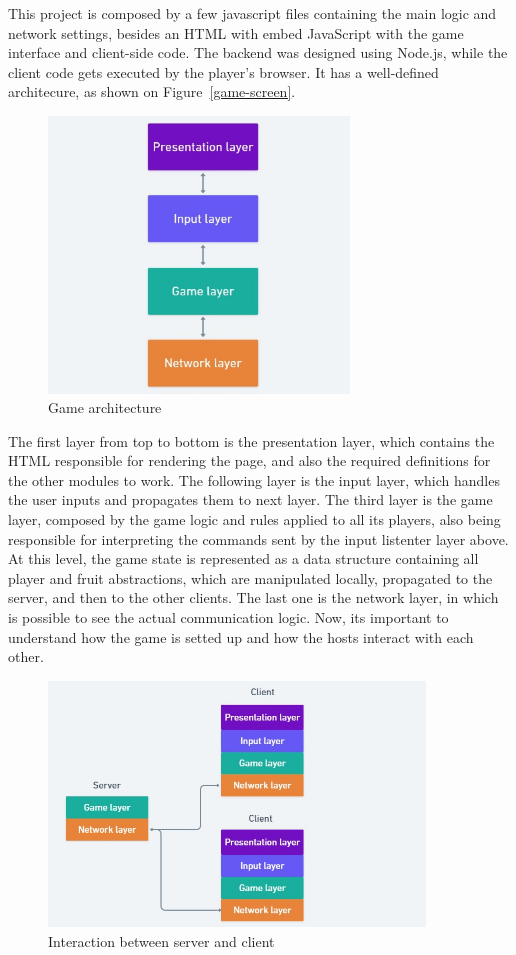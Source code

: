 \documentclass[english]{sbrt}
\begin{document}
This project is composed by a few javascript files containing the main logic and network settings, besides an HTML with embed JavaScript with the game interface and client-side code. The backend was designed using Node.js, while the client code gets executed by the player's browser. It has a well-defined architecure, as shown on Figure~\ref{game-screen}.

\begin{figure}[H]
  \centering
  \includegraphics[width=8cm]{game-layers.jpg}
  \caption{Game architecture}
  \label{game-layers}
\end{figure}

The first layer from top to bottom is the presentation layer, which contains the HTML responsible for rendering the page, and also the required definitions for the other modules to work.
The following layer is the input layer, which handles the user inputs and propagates them to next layer. The third layer is the game layer, composed by the game logic and rules
applied to all its players, also being responsible for interpreting the commands sent by the input listenter layer above. At this level, the game state is represented as a data structure containing
all player and fruit abstractions, which are manipulated locally, propagated to the server, and then to the other clients. The last one is the network layer, in which is possible to see the actual communication logic.
Now, its important to understand how the game is setted up and how the hosts interact with each other.

\begin{figure}[H]
  \centering
  \includegraphics[width=10cm]{game-diagram.jpg}
  \caption{Interaction between server and client}
  \label{game-diagram}
\end{figure}
\end{document}
